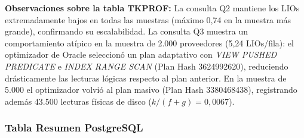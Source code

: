 \documentclass[12pt,a4paper]{article}
\begin{document}
\noindent\textbf{Observaciones sobre la tabla TKPROF:} La consulta Q2 mantiene los LIOs extremadamente bajos en todas las muestras (máximo 0,74 en la muestra más grande), confirmando su escalabilidad. La consulta Q3 muestra un comportamiento atípico en la muestra de 2.000 proveedores (5,24 LIOs/fila): el optimizador de Oracle seleccionó un plan adaptativo con \textit{VIEW PUSHED PREDICATE} e \textit{INDEX RANGE SCAN} (Plan Hash 3624992620), reduciendo drásticamente las lecturas lógicas respecto al plan anterior. En la muestra de 5.000 el optimizador volvió al plan masivo (Plan Hash 3380468438), registrando además 43.500 lecturas físicas de disco ($k/(f{+}g) = 0,0067$).

\subsubsection{Tabla Resumen PostgreSQL}
\end{document}
